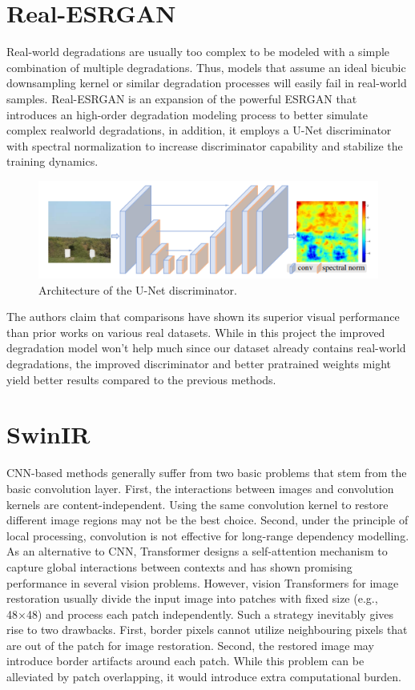 \section{Real-ESRGAN}
\label{subsec:realesrgan}

Real-world degradations are usually too complex to be modeled with a simple combination of multiple degradations. Thus, models that assume an ideal bicubic
downsampling kernel or similar degradation processes will easily fail in real-world samples. Real-ESRGAN\cite{9711325} is an expansion of the powerful ESRGAN that introduces an high-order degradation modeling process to better simulate complex realworld degradations, in addition,
it employs a U-Net discriminator with spectral normalization to increase discriminator capability and stabilize the training dynamics.

\begin{figure}[H]
  \centering
  \includegraphics[scale=0.4]{figures/UNET.png}
  \caption{Architecture of the U-Net discriminator.}
  \label{img:UNET}
\end{figure}

The authors claim that comparisons have shown its superior visual performance than prior works on various real datasets. While in this project the improved degradation model won't help much since our dataset already contains real-world degradations, the improved discriminator and better pratrained weights might yield better results compared to the previous methods.

\section{SwinIR}
\label{subsec:swinir}

CNN-based methods generally suffer from two basic
problems that stem from the basic convolution layer. First, the interactions between images and convolution kernels are content-independent. Using the same convolution kernel to restore different image regions may not be the best choice. Second, under the principle of local processing, convolution is not effective for long-range dependency modelling. As an alternative to CNN, Transformer designs a self-attention mechanism to capture global interactions between contexts and has shown promising performance in several vision problems. However, vision Transformers for image restoration usually divide the input image into patches with fixed size (e.g., 48×48) and process each patch independently. Such a strategy inevitably gives rise to two drawbacks. First, border pixels cannot utilize neighbouring pixels that are out of the patch for image restoration. Second, the restored image may introduce border artifacts around each patch. While this problem can be alleviated by patch overlapping, it would introduce extra computational burden.

